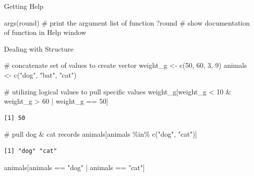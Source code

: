 \documentclass[
  letterpaper,
  DIV=11,
  numbers=noendperiod]{scrreprt}
\newenvironment{Shaded}{\begin{snugshade}}{\end{snugshade}}
\newcommand{\CommentTok}[1]{\textcolor[rgb]{0.37,0.37,0.37}{#1}}
\newcommand{\DecValTok}[1]{\textcolor[rgb]{0.68,0.00,0.00}{#1}}
\newcommand{\FunctionTok}[1]{\textcolor[rgb]{0.28,0.35,0.67}{#1}}
\newcommand{\NormalTok}[1]{\textcolor[rgb]{0.00,0.23,0.31}{#1}}
\newcommand{\OtherTok}[1]{\textcolor[rgb]{0.00,0.23,0.31}{#1}}
\newcommand{\SpecialCharTok}[1]{\textcolor[rgb]{0.37,0.37,0.37}{#1}}
\newcommand{\StringTok}[1]{\textcolor[rgb]{0.13,0.47,0.30}{#1}}
\begin{document}
Getting Help

\begin{Shaded}
\begin{Highlighting}[]
\FunctionTok{args}\NormalTok{(round) }\CommentTok{\# print the argument list of function}
\NormalTok{?round }\CommentTok{\# show documentation of function in Help window}
\end{Highlighting}
\end{Shaded}

Dealing with Structure

\begin{Shaded}
\begin{Highlighting}[]
\CommentTok{\# concatenate set of values to create vector}
\NormalTok{weight\_g }\OtherTok{\textless{}{-}} \FunctionTok{c}\NormalTok{(}\DecValTok{50}\NormalTok{, }\DecValTok{60}\NormalTok{, }\DecValTok{3}\NormalTok{, }\DecValTok{9}\NormalTok{)}
\NormalTok{animals }\OtherTok{\textless{}{-}} \FunctionTok{c}\NormalTok{(}\StringTok{"dog"}\NormalTok{, }\StringTok{"bat"}\NormalTok{, }\StringTok{"cat"}\NormalTok{)}

\CommentTok{\# utilizing logical values to pull specific values}
\NormalTok{weight\_g[weight\_g }\SpecialCharTok{\textless{}} \DecValTok{10} \SpecialCharTok{\&}\NormalTok{ weight\_g }\SpecialCharTok{\textgreater{}} \DecValTok{60} \SpecialCharTok{|}\NormalTok{ weight\_g }\SpecialCharTok{==} \DecValTok{50}\NormalTok{]}
\end{Highlighting}
\end{Shaded}

\begin{verbatim}
[1] 50
\end{verbatim}

\begin{Shaded}
\begin{Highlighting}[]
\CommentTok{\# pull dog \& cat records}
\NormalTok{animals[animals }\SpecialCharTok{\%in\%} \FunctionTok{c}\NormalTok{(}\StringTok{"dog"}\NormalTok{, }\StringTok{"cat"}\NormalTok{)]}
\end{Highlighting}
\end{Shaded}

\begin{verbatim}
[1] "dog" "cat"
\end{verbatim}

\begin{Shaded}
\begin{Highlighting}[]
\NormalTok{animals[animals }\SpecialCharTok{==} \StringTok{"dog"} \SpecialCharTok{|}\NormalTok{ animals }\SpecialCharTok{==} \StringTok{"cat"}\NormalTok{]}
\end{Highlighting}
\end{Shaded}
\end{document}

